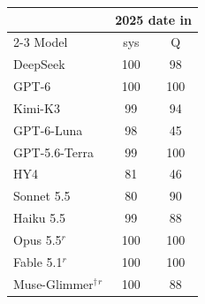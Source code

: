 \begin{tabular}{@{}l cc@{}}
\toprule
 & \multicolumn{2}{c}{2025 date in} \\
\cmidrule(lr){2-3}
Model & sys & Q \\
\midrule
DeepSeek & 100 & 98 \\
GPT-6 & 100 & 100 \\
Kimi-K3 & 99 & 94 \\
GPT-6-Luna & 98 & 45 \\
GPT-5.6-Terra & 99 & 100 \\
HY4 & 81 & 46 \\
Sonnet 5.5 & 80 & 90 \\
Haiku 5.5 & 99 & 88 \\
Opus 5.5$^{r}$ & 100 & 100 \\
Fable 5.1$^{r}$ & 100 & 100 \\
Muse-Glimmer$^\dagger$$^{r}$ & 100 & 88 \\
\bottomrule
\end{tabular}
